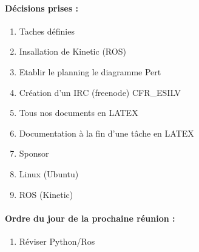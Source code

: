 \documentclass[12pt]{report}
\begin{document}
\paragraph{Décisions prises :}
\begin{enumerate}
 \item Taches définies
 \item Insallation de Kinetic (ROS)
 \item Etablir le planning le diagramme Pert
 \item Création d'un IRC (freenode) CFR\_ESILV
 \item Tous nos documents en LATEX
 \item Documentation à la fin d'une tâche en LATEX
 \item Sponsor
 \item Linux (Ubuntu)
 \item ROS (Kinetic)
\end{enumerate}


\paragraph{Ordre du jour de la prochaine réunion :}
\begin{enumerate}
 \item Réviser Python/Ros 
\end{enumerate}
\end{document}
